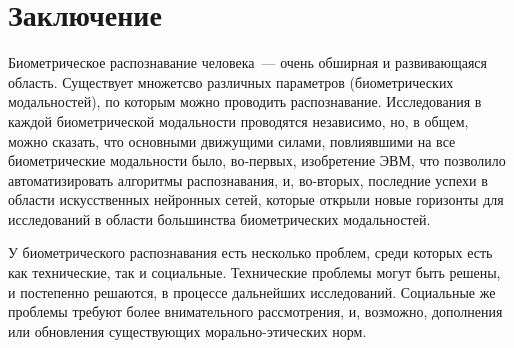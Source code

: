 \documentclass[14pt, a4paper]{extarticle}
\begin{document}
\newpage
\section{Заключение}
Биометрическое распознавание человека~--- очень обширная и развивающаяся область. Существует множетсво различных параметров (биометрических модальностей), по которым можно проводить распознавание. Исследования в каждой биометрической модальности проводятся независимо, но, в общем, можно сказать, что основными движущими силами, повлиявшими на все биометрические модальности было, во-первых, изобретение ЭВМ, что позволило автоматизировать алгоритмы распознавания, и, во-вторых, последние успехи в области искусственных нейронных сетей, которые открыли новые горизонты для исследований в области большинства биометрических модальностей.

У биометрического распознавания есть несколько проблем, среди которых есть как технические, так и социальные. Технические проблемы могут быть решены, и постепенно решаются, в процессе дальнейших исследований. Социальные же проблемы требуют более внимательного рассмотрения, и, возможно, дополнения или обновления существующих морально-этических норм.

	
\newpage

\end{document}
